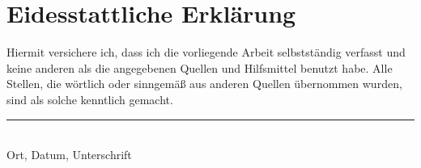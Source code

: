 \chapter*{Eidesstattliche Erklärung}

Hiermit versichere ich, dass ich die vorliegende Arbeit selbstständig verfasst
und keine anderen als die angegebenen Quellen und Hilfsmittel benutzt habe.
Alle Stellen, die wörtlich oder sinngemäß aus anderen Quellen übernommen wurden,
sind als solche kenntlich gemacht.

\vspace{2cm}
\noindent\rule{6cm}{0.4pt}\\
Ort, Datum, Unterschrift
